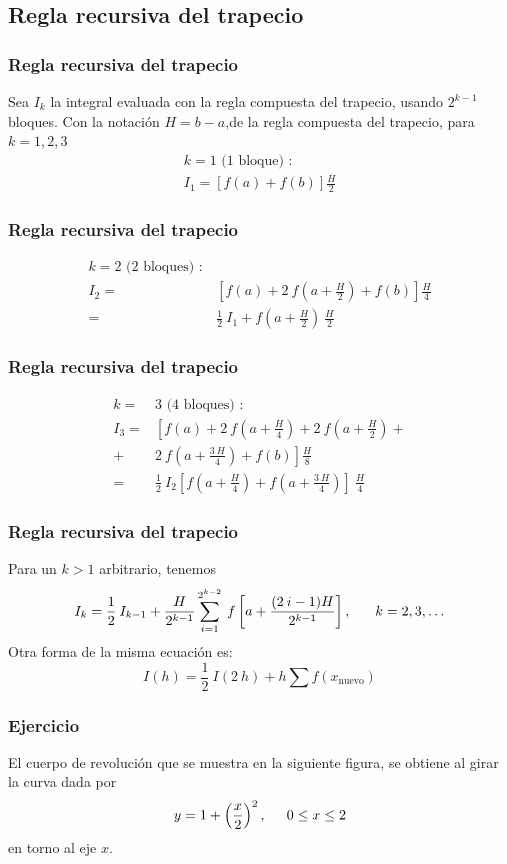 \subsection{Regla recursiva del trapecio}
\begin{frame}
\frametitle{Regla recursiva del trapecio}
Sea $I_{k}$ la integral evaluada con la regla compuesta del trapecio, usando $2^{k-1}$ bloques. Con la notación $H=b-a$,de la regla compuesta del trapecio, para $k=1,2,3$
\[
	\begin{split}
		k = 1 \text{ (1 bloque) }: \\
		I_{1} = [f(a) + f(b)] \frac{H}{2}
	\end{split}
\]
\end{frame}
\begin{frame}
\frametitle{Regla recursiva del trapecio}
\[
	\begin{split}
		k = 2 \text{ (2 bloques) }: \\
		I_{2} =& \left[ f(a) + 2 \: f\left(a+\frac{H}{2} \right) + f(b) \right] \frac{H}{4} \\
		=& \frac{1}{2} \: I_{1} + f \left( a + \frac{H}{2} \right) \: \frac{H}{2}
	\end{split}
\]
\end{frame}
\begin{frame}
\frametitle{Regla recursiva del trapecio}
\[
	\begin{split}
		k = &3 \text{ (4 bloques) }: \\
		I_{3} =& \left[ f(a) + 2 \: f \left(a + \frac{H}{4} \right) + 2 \: f \left( a + \frac{H}{2} \right) + \right.\\
		 +& \left. 2 \: f \left( a + \frac{3 \: H}{4} \right) + f(b) \right] \frac{H}{8} \\
		=& \frac{1}{2} \: I_{2} \left[f\left(a+\frac{H}{4} \right) + f\left(a+\frac{3 \: H}{4}\right) \right] \: \frac{H}{4}
	\end{split}
\]
\end{frame}
\begin{frame}
\frametitle{Regla recursiva del trapecio}
Para un $k > 1$ arbitrario, tenemos
\[ I_{k} = \dfrac{1}{2} \: I_{k - 1} + \dfrac{H}{2^{k - 1}} \sum_{i = 1}^{2^{k - 2}} \: f \left[ a + \dfrac{(2 \: i - 1)H}{2^{k - 1}} \right], \hspace{0.6cm} k=2,3,\ldots\]
Otra forma de la misma ecuación es:
\[ I(h) = \dfrac{1}{2} \: I(2 \: h) + h \sum f(x_{\text{nuevo}}) \]
\end{frame}
\begin{frame}
\frametitle{Ejercicio}
El cuerpo de revolución que se muestra en la siguiente figura, se obtiene al girar la curva dada por
\[ y= 1 + \left( \dfrac{x}{2} \right)^{2}, \hspace{0.5cm} 0 \leq x \leq 2\]
en torno al eje $x$.
\end{frame}
